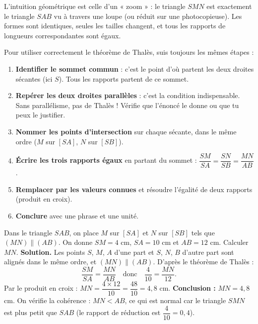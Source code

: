 \documentclass[11pt]{article}
\begin{document}
L'intuition géométrique est celle d'un « zoom » : le triangle $SMN$ est exactement le triangle $SAB$ vu à travers une loupe (ou réduit sur une photocopieuse). Les formes sont identiques, seules les tailles changent, et tous les rapports de longueurs correspondantes sont égaux.

\begin{methode}
Pour utiliser correctement le théorème de Thalès, suis toujours les mêmes étapes :
\begin{enumerate}
\item \textbf{Identifier le sommet commun} : c'est le point d'où partent les deux droites sécantes (ici $S$). Tous les rapports partent de ce sommet.
\item \textbf{Repérer les deux droites parallèles} : c'est la condition indispensable. Sans parallélisme, pas de Thalès ! Vérifie que l'énoncé le donne ou que tu peux le justifier.
\item \textbf{Nommer les points d'intersection} sur chaque sécante, dans le même ordre ($M$ sur $[SA]$, $N$ sur $[SB]$).
\item \textbf{Écrire les trois rapports égaux} en partant du sommet : $\dfrac{SM}{SA} = \dfrac{SN}{SB} = \dfrac{MN}{AB}$.
\item \textbf{Remplacer par les valeurs connues} et résoudre l'égalité de deux rapports (produit en croix).
\item \textbf{Conclure} avec une phrase et une unité.
\end{enumerate}
\end{methode}

\begin{exoresolu}
Dans le triangle $SAB$, on place $M$ sur $[SA]$ et $N$ sur $[SB]$ tels que $(MN) \parallel (AB)$. On donne $SM = 4$ cm, $SA = 10$ cm et $AB = 12$ cm. Calculer $MN$.
\tcblower
\textbf{Solution.} Les points $S$, $M$, $A$ d'une part et $S$, $N$, $B$ d'autre part sont alignés dans le même ordre, et $(MN) \parallel (AB)$. D'après le théorème de Thalès :
\[ \dfrac{SM}{SA} = \dfrac{MN}{AB} \quad \text{donc} \quad \dfrac{4}{10} = \dfrac{MN}{12}. \]
Par le produit en croix : $MN = \dfrac{4 \times 12}{10} = \dfrac{48}{10} = 4,8$ cm.
\textbf{Conclusion :} $MN = 4,8$ cm. On vérifie la cohérence : $MN < AB$, ce qui est normal car le triangle $SMN$ est plus petit que $SAB$ (le rapport de réduction est $\dfrac{4}{10} = 0,4$).
\end{exoresolu}
\end{document}
